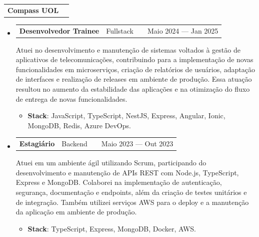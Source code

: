 \documentclass[a4paper,12pt]{article}
\makeatletter
\newenvironment{joblong}[2]{
  \begin{tabularx}{\linewidth}{@{}l X@{}}
    \textbf{#1} & \if\relax\detokenize{#2}\relax\else #2\fi \\
  \end{tabularx}
  \begin{itemize}[leftmargin=1.5em,label={},itemsep=5pt,topsep=0pt]
}{
  \end{itemize}
}
\newenvironment{role}[3]{
  \item
  \begin{tabularx}{\linewidth}{@{}l X r@{}}
    {\small\textbf{#1}}\ \ {\footnotesize\if\relax\detokenize{#3}\relax\else #3\fi} & \hfill & #2 \\
  \end{tabularx}
    }
    {
    }
\makeatother
\begin{document}
\begin{joblong}{Compass UOL}{}
  \begin{role}{Desenvolvedor Trainee}{Maio 2024 — Jan 2025}{Fullstack}
    Atuei no desenvolvimento e manutenção de sistemas voltados à gestão de aplicativos de telecomunicações, contribuindo para a implementação de novas funcionalidades em microserviços, criação de relatórios de usuários, adaptação de interfaces e realização de releases em ambiente de produção. Essa atuação resultou no aumento da estabilidade das aplicações e na otimização do fluxo de entrega de novas funcionalidades.
    \begin{itemize}[nosep,after=\strut, leftmargin=0em, itemsep=3pt,label={}]
        \item \textbf{Stack}: JavaScript, TypeScript, NestJS, Express, Angular, Ionic, MongoDB, Redis, Azure DevOps.
    \end{itemize}
  \end{role}
  \begin{role}{Estagiário}{Maio 2023 — Out 2023}{Backend}
    Atuei em um ambiente ágil utilizando Scrum, participando do desenvolvimento e manutenção de APIs REST com Node.js, TypeScript, Express e MongoDB. Colaborei na implementação de autenticação, segurança, documentação e endpoints, além da criação de testes unitários e de integração. Também utilizei serviços AWS para o deploy e a manutenção da aplicação em ambiente de produção.
    \begin{itemize}[nosep,after=\strut, leftmargin=0em, itemsep=3pt,label={}]
        \item \textbf{Stack}: TypeScript, Express, MongoDB, Docker, AWS.
    \end{itemize}
  \end{role}
\end{joblong}

\end{document}
